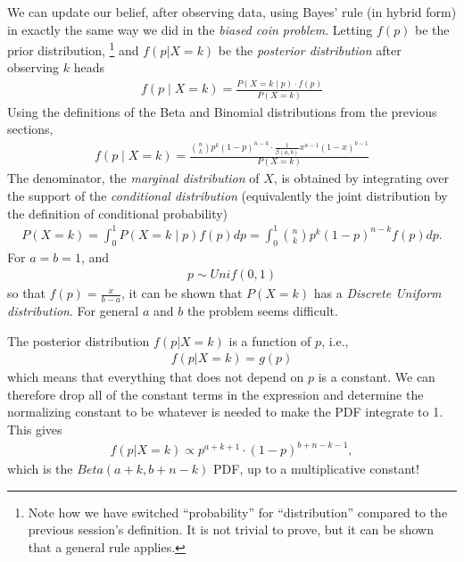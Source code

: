 \documentclass[11pt,a4paper]{article}
\begin{document}
We can update our belief, 
after observing data, 
using Bayes' rule (in hybrid form) 
in exactly the same way we did in the \emph{biased coin problem}. 
Letting \(f(p)\) be the prior distribution,%
\footnote{Note how we have 
switched ``probability'' for ``distribution'' compared 
to the previous session's definition. 
It is not trivial to prove, 
but it can be shown that a general rule applies.} 
and \(f(p|X = k)\) be the \emph{posterior distribution} after observing \(k\) heads
\begin{align}
f\left( p \middle| X = k \right) = 
\frac{P\left( X = k \middle| p \right) \cdot f(p)}{P(X = k)}
\end{align}
Using the definitions of the Beta and Binomial distributions from the previous sections,
\begin{align}
f\left( p \middle| X = k \right) = 
\frac{\binom{n}{k}p^{k}(1 - p)^{n - k} \cdot \frac{1}{\beta(a,b)}x^{a - 1}(1 - x)^{b - 1}}{P(X = k)}
\end{align}
The denominator, 
the \emph{marginal distribution} of \(X\), 
is obtained by integrating over the support of the 
\emph{conditional distribution} (equivalently the joint distribution 
by the definition of conditional probability)
\begin{align}
P(X = k) = \int_{0}^{1}{P\left( X = k \middle| p \right)f(p)dp} = 
\int_{0}^{1}{\binom{n}{k}p^{k}(1 - p)^{n - k}f(p)dp}.
\end{align}
For \(a = b = 1\), and
\begin{align}
p \sim Unif(0,1)
\end{align}
so that \(f(p) = \frac{x}{b - a}\), 
it can be shown that \(P(X = k)\) has a \emph{Discrete Uniform distribution}. 
For general \(a\) and \(b\) the problem seems difficult.

The posterior distribution \(f(p|X = k)\) is a function of \(p\), i.e.,
\begin{align}
f\left( p | X = k \right) = g(p)
\end{align}
which means that everything that does not depend on \(p\) is a constant.
We can therefore drop all of the constant terms in the expression and
determine the normalizing constant to be whatever is needed to make the
PDF integrate to 1. 
This gives
\begin{align}
f\left( p | X = k \right) \propto 
p^{a + k + 1} \cdot (1 - p)^{b + n - k - 1},
\end{align}
which is the \(Beta(a + k,b + n - k)\) PDF, 
up to a multiplicative constant! 
\end{document}
